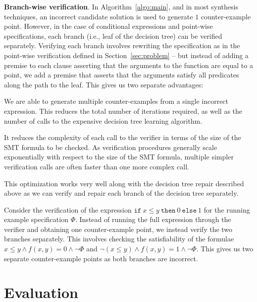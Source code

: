 \documentclass{llncs}
\newcommand\Spec{\Phi}
\newcommand\ITE[3]{\mathtt{if}~#1~\mathtt{then}~#2~\mathtt{else}~#3}
\renewcommand{\paragraph}[1]{\par\noindent\textbf{#1}.}
\begin{document}
\paragraph{Branch-wise verification}
In Algorithm~\ref{algo:main}, and in most synthesis techniques, an
incorrect candidate solution is used to generate $1$ counter-example
point.
However, in the case of conditional expressions and point-wise
specifications, each branch (i.e., leaf of the decision tree) can be
verified separately.
Verifying each branch involves rewriting the specification as in the
point-wise verification defined in Section~\ref{sec:problem} -- but
instead of adding a premise to each clause asserting that the arguments
to the function are equal to a point, we add a premise that asserts that
the arguments satisfy all predicates along the path to the leaf.
This gives us two separate advantages:
\begin{compactitem}
\item We are able to generate multiple counter-examples from a single
  incorrect expression.
  This reduces the total number of iterations required, as well as the
  number of calls to the expensive decision tree learning algorithm.
\item It reduces the complexity of each call to the verifier in terms of
  the size of the SMT formula to be checked.
  As verification procedures generally scale exponentially with respect
  to the size of the SMT formula, multiple simpler verification calls
  are often faster than one more complex call.
\end{compactitem}
This optimization works very well along with the decision tree repair
described above as we can verify and repair each branch of the decision
tree separately.

\begin{example}
  Consider the verification of the expression $\ITE{x \leq y}{0}{1}$
  for the running example specification $\Spec$.
  Instead of running the full expression through the verifier and
  obtaining one counter-example point, we instead verify the two
  branches separately.
  This involves checking the satisfiability of the formulae $x \leq y
  \wedge f(x, y) = 0 \wedge \neg \Spec$ and $\neg (x \leq y) \wedge f(x,
  y) = 1 \wedge \neg \Spec$.
  This gives us two separate counter-example points as both branches are
  incorrect.
\end{example}

\section{Evaluation}
\label{sec:evaluation}
% 


\end{document}
